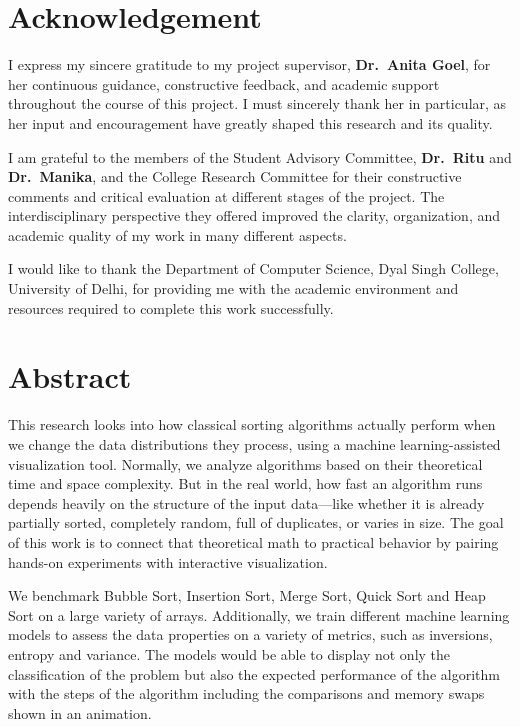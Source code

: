 \documentclass[12pt,a4paper,oneside,openany]{report}
\begin{document}
\chapter*{Acknowledgement}

I express my sincere gratitude to my project supervisor, \textbf{Dr.\ Anita Goel}, for her continuous guidance, constructive feedback, and academic support throughout the course of this project. I must sincerely thank her in particular, as her input and encouragement have greatly shaped this research and its quality.

I am grateful to the members of the Student Advisory Committee, \textbf{Dr.\ Ritu} and \textbf{Dr.\ Manika}, and the College Research Committee for their constructive comments and critical evaluation at different stages of the project. The interdisciplinary perspective they offered improved the clarity, organization, and academic quality of my work in many different aspects.

I would like to thank the Department of Computer Science, Dyal Singh College, University of Delhi, for providing me with the academic environment and resources required to complete this work successfully.
\chapter*{Abstract}

This research looks into how classical sorting algorithms actually perform when we change the data distributions they process, using a machine learning-assisted visualization tool. Normally, we analyze algorithms based on their theoretical time and space complexity. But in the real world, how fast an algorithm runs depends heavily on the structure of the input data—like whether it is already partially sorted, completely random, full of duplicates, or varies in size. The goal of this work is to connect that theoretical math to practical behavior by pairing hands-on experiments with interactive visualization.

We benchmark Bubble Sort, Insertion Sort, Merge Sort, Quick Sort and Heap Sort on a large variety of arrays. Additionally, we train different machine learning models to assess the data properties on a variety of metrics, such as inversions, entropy and variance. The models would be able to display not only the classification of the problem but also the expected performance of the algorithm with the steps of the algorithm including the comparisons and memory swaps shown in an animation.
\end{document}
